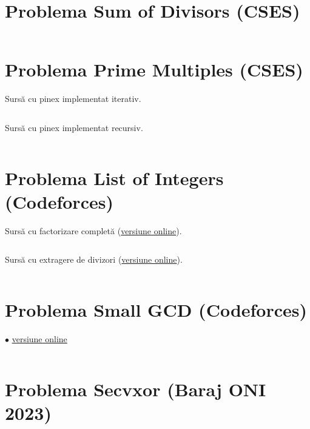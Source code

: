 \documentclass[../main.tex]{subfiles}
\begin{document}
\inputminted{cpp}{../src/math/common-divisors.cpp}

\section{Problema Sum of Divisors (CSES)}
\label{code:sum-of-divisors}

\inputminted{cpp}{../src/math/sum-of-divisors.cpp}

\section{Problema Prime Multiples (CSES)}
\label{code:prime-multiples}

Sursă cu pinex implementat iterativ.

\inputminted{cpp}{../src/math/prime-multiples-iter.cpp}

Sursă cu pinex implementat recursiv.

\inputminted{cpp}{../src/math/prime-multiples-rec.cpp}

\section{Problema List of Integers (Codeforces)}
\label{code:list-of-integers}

Sursă cu factorizare completă (\href{https://codeforces.com/contest/920/submission/236912179}{versiune online}).

\inputminted{cpp}{../src/math/list-of-integers-1.cpp}

Sursă cu extragere de divizori (\href{https://codeforces.com/contest/920/submission/237152672}{versiune online}).

\inputminted{cpp}{../src/math/list-of-integers-2.cpp}

\section{Problema Small GCD (Codeforces)}
\label{code:small-gcd}
$\bullet$
\href{https://codeforces.com/contest/1900/submission/287895330}{versiune online}

\inputminted{cpp}{../src/math/small-gcd.cpp}

\section{Problema Secvxor (Baraj ONI 2023)}
\label{code:secvxor}
\end{document}
